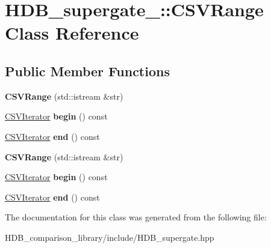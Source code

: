 \hypertarget{classHDB__supergate___1_1CSVRange}{}\section{H\+D\+B\+\_\+supergate\+\_\+\+:\+:C\+S\+V\+Range Class Reference}
\label{classHDB__supergate___1_1CSVRange}
\subsection*{Public Member Functions}
\begin{DoxyCompactItemize}
\item 
\mbox{\label{classHDB__supergate___1_1CSVRange_a4c2fa86201de65f0bbeadd40f8f9af2e}} 
{\bfseries C\+S\+V\+Range} (std\+::istream \&str)
\item 
\mbox{\label{classHDB__supergate___1_1CSVRange_a1dc5c2c997da3713670f28d63fafc0fa}} 
\hyperlink{classHDB__supergate___1_1CSVIterator}{C\+S\+V\+Iterator} {\bfseries begin} () const
\item 
\mbox{\label{classHDB__supergate___1_1CSVRange_a14f94a53f34d5cad0f677e3c862e8039}} 
\hyperlink{classHDB__supergate___1_1CSVIterator}{C\+S\+V\+Iterator} {\bfseries end} () const
\item 
\mbox{\label{classHDB__supergate___1_1CSVRange_a4c2fa86201de65f0bbeadd40f8f9af2e}} 
{\bfseries C\+S\+V\+Range} (std\+::istream \&str)
\item 
\mbox{\label{classHDB__supergate___1_1CSVRange_a1dc5c2c997da3713670f28d63fafc0fa}} 
\hyperlink{classHDB__supergate___1_1CSVIterator}{C\+S\+V\+Iterator} {\bfseries begin} () const
\item 
\mbox{\label{classHDB__supergate___1_1CSVRange_a14f94a53f34d5cad0f677e3c862e8039}} 
\hyperlink{classHDB__supergate___1_1CSVIterator}{C\+S\+V\+Iterator} {\bfseries end} () const
\end{DoxyCompactItemize}


The documentation for this class was generated from the following file\+:\begin{DoxyCompactItemize}
\item 
H\+D\+B\+\_\+comparison\+\_\+library/include/H\+D\+B\+\_\+supergate.\+hpp\end{DoxyCompactItemize}
